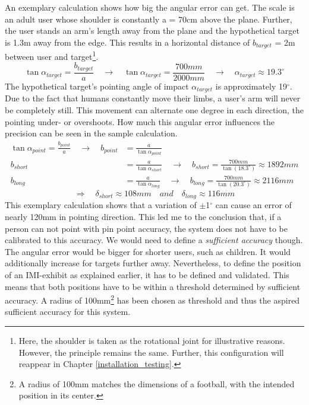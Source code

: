 An exemplary calculation shows how big the angular error can get. The scale is an adult user whose shoulder is constantly a = 70cm above the plane. Further, the user stands an arm's length away from the plane and the hypothetical target is 1.3m away from the edge. This results in a horizontal distance of $b_{target}$ = 2m between user and target\footnote{Here, the shoulder is taken as the rotational joint for illustrative reasons. However, the principle remains the same. Further, this configuration will reappear in Chapter \ref{installation_testing}.}.
$$\tan{\alpha_{target}} = \frac{b_{target}}{a} \quad \to \quad \tan{\alpha_{target}} = \frac{700mm}{2000mm} \quad \to \quad \alpha_{target} \approx 19.3^\circ$$
The hypothetical target's pointing angle of impact $\alpha_{target}$ is approximately 19$^\circ$. Due to the fact that humans constantly move their limbs, a user's arm will never be completely still. This movement can alternate one degree in each direction, the pointing under- or overshoots. How much this angular error influences the precision can be seen in the sample calculation.
\begin{align*}
	\tan{\alpha_{point}} = \frac{b_{point}}{a} \quad \to \quad b_{point} &= \frac{a}{\tan{\alpha_{point}}}
	\\
	b_{short} &= \frac{a}{\tan{\alpha_{short}}} \quad \to \quad b_{short} = \frac{700mm}{\tan{(18.3^\circ)}} \approx 1892mm
	\\
	b_{long} &= \frac{a}{\tan{\alpha_{long}}} \quad \to \quad b_{long} = \frac{700mm}{\tan{(20.3^\circ)}} \approx 2116mm
\end{align*}
$$\Rightarrow \quad \delta_{short} \approx 108mm \quad and \quad \delta_{long} \approx 116mm$$
This exemplary calculation shows that a variation of $\pm$1$^\circ$ can cause an error of nearly 120mm in pointing direction. This led me to the conclusion that, if a person can not point with pin point accuracy, the system does not have to be calibrated to this accuracy. We would need to define a \textit{sufficient accuracy} though. The angular error would be bigger for shorter users, such as children. It would additionally increase for targets further away. Nevertheless, to define the position of an \ac{IMI}-exhibit as explained earlier, it has to be defined and validated. This means that both positions have to be within a threshold determined by sufficient accuracy. A radius of 100mm\footnote{A radius of 100mm matches the dimensions of a football, with the intended position in its center.} has been chosen as threshold and thus the aspired sufficient accuracy for this system. 

